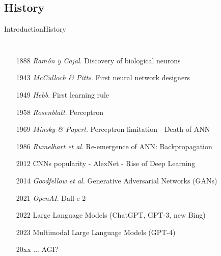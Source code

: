 \documentclass[10pt,compress]{beamer} %
\begin{document}
\subsection{History}
\begin{frame}{Introduction}{History}
    \begin{columns}

	\begin{itemize}
	\item[1888] \textit{Ramón y Cajal}. Discovery of biological neurons
	\item[1943] \textit{McCulloch \& Pitts}. First neural network designers
	\item[1949] \textit{Hebb}. First learning rule
	\item[1958] \textit{Rosenblatt}. Perceptron
	\item[1969] \textit{Minsky \& Papert}.  Perceptron limitation - Death of ANN
	\item[1986] \textit{Rumelhart et al}. Re-emergence of ANN: Backpropagation
	\item[2012] CNNs popularity - AlexNet - Rise of Deep Learning
	\item[2014] \textit{Goodfellow et al.} Generative Adversarial Networks (GANs)
	\item[2021] \textit{OpenAI}. Dall-e 2
	\item[2022] Large Language Models (ChatGPT, GPT-3, new Bing)
	\item[2023] Multimodal Large Language Models (GPT-4)
	\item[20xx] ... AGI?
	\end{itemize}


\end{columns}
\end{frame}
\end{document}
